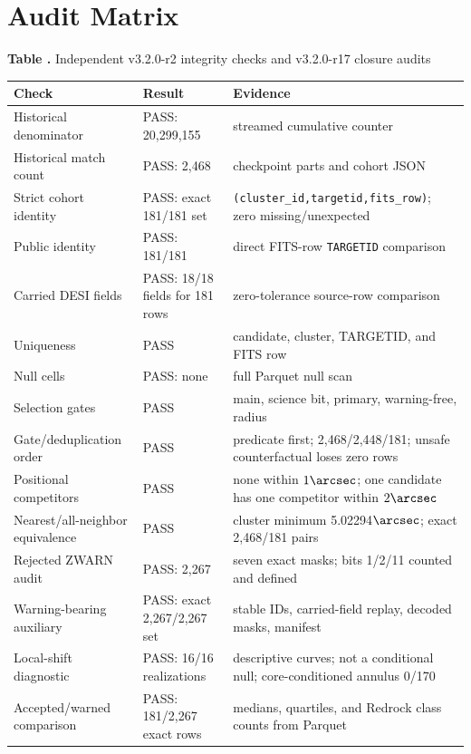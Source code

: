 \documentclass[twocolumn,linenumbers]{aastex702}
\newcommand{\paperVersion}{v3.2.0-r17}
\newcommand{\releaseVersion}{v3.2.0-r2}
\begin{document}
\section{Audit Matrix}\label{app:audit}

\label{tab:audit}
\begin{center}
\textbf{Table \thetable.} Independent \releaseVersion{} integrity checks and \paperVersion{} closure audits

\smallskip
\scriptsize
\begin{tabular}{p{}p{}p{}}
\toprule
Check & Result & Evidence \\
\midrule
Historical denominator & PASS: 20,299,155 & streamed cumulative counter \\
Historical match count & PASS: 2,468 & checkpoint parts and cohort JSON \\
Strict cohort identity & PASS: exact 181/181 set & \texttt{(cluster\_id,targetid,fits\_row)}; zero missing/unexpected \\
Public identity & PASS: 181/181 & direct FITS-row \texttt{TARGETID} comparison \\
Carried DESI fields & PASS: 18/18 fields for 181 rows & zero-tolerance source-row comparison \\
Uniqueness & PASS & candidate, cluster, TARGETID, and FITS row \\
Null cells & PASS: none & full Parquet null scan \\
Selection gates & PASS & main, science bit, primary, warning-free, radius \\
Gate/deduplication order & PASS & predicate first; 2,468/2,448/181; unsafe counterfactual loses zero rows \\
Positional competitors & PASS & none within $1\arcsec$; one candidate has one competitor within $2\arcsec$ \\
Nearest/all-neighbor equivalence & PASS & cluster minimum 5.02294$\arcsec$; exact 2,468/181 pairs \\
Rejected ZWARN audit & PASS: 2,267 & seven exact masks; bits 1/2/11 counted and defined \\
Warning-bearing auxiliary & PASS: exact 2,267/2,267 set & stable IDs, carried-field replay, decoded masks, manifest \\
Local-shift diagnostic & PASS: 16/16 realizations & descriptive curves; not a conditional null; core-conditioned annulus 0/170 \\
Accepted/warned comparison & PASS: 181/2,267 exact rows & medians, quartiles, and Redrock class counts from Parquet \\

\end{tabular}
\end{center}
\end{document}
